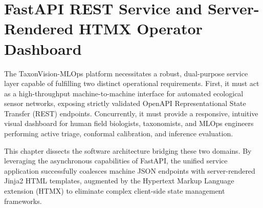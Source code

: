 \chapter{FastAPI REST Service and Server-Rendered HTMX Operator Dashboard}
\label{ch:fastapi_service_architecture}


The TaxonVision-MLOps platform necessitates a robust, dual-purpose service layer capable of fulfilling two distinct operational requirements. First, it must act as a high-throughput machine-to-machine interface for automated ecological sensor networks, exposing strictly validated OpenAPI Representational State Transfer (REST) endpoints. Concurrently, it must provide a responsive, intuitive visual dashboard for human field biologists, taxonomists, and MLOps engineers performing active triage, conformal calibration, and inference evaluation.

This chapter dissects the software architecture bridging these two domains. By leveraging the asynchronous capabilities of FastAPI, the unified service application successfully coalesces machine JSON endpoints with server-rendered Jinja2 HTML templates, augmented by the Hypertext Markup Language extension (HTMX) to eliminate complex client-side state management frameworks.

